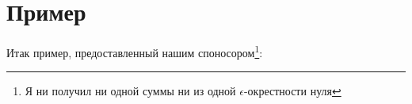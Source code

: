\section{Пример}
Итак пример, предоставленный нашим споносором\cite{Sponsor}\footnote{Я ни получил ни одной суммы ни из одной $\epsilon$-окрестности нуля}:

